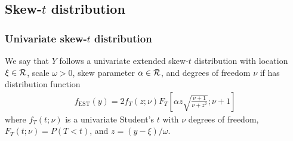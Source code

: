 \documentclass[11pt]{article}
\begin{document}


\subsection{Skew-$t$ distribution} \label{a:skewt}
\subsubsection*{Univariate skew-$t$ distribution}
We say that $Y$ follows a univariate extended skew-$t$ distribution with location $\xi \in {\cal R}$, scale $\omega > 0$, skew parameter $\alpha \in {\cal R}$, and degrees of freedom $\nu$ if has distribution function
\begin{align}
  f_{\text{EST}}(y) = 2 f_T (z; \nu) F_T\left[ \alpha z \sqrt{ \frac{ \nu + 1 }{ \nu + z^2}}; \nu + 1 \right]
\end{align}
where $f_T(t; \nu)$ is a univariate Student's $t$ with $\nu$ degrees of freedom, $F_T(t; \nu) = P(T < t)$, and \hbox{$z = (y - \xi) / \omega$}.
\end{document}
